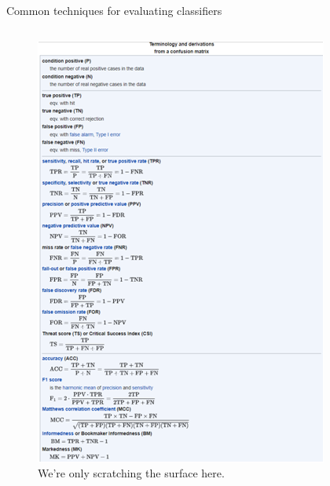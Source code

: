 \documentclass[aspectratio=169]{../latex_main/tntbeamer}  %
\begin{document}
\begin{frame}{Common techniques for evaluating classifiers}
\begin{columns}
	        
	        \begin{column}{.5\textwidth}
	                \begin{figure}
	                    \centering
	                    \includegraphics[scale=.55]{Bild31}\\
	                    We’re only scratching the surface here.
	                \end{figure}
	        \end{column}
	        
	    \end{columns}
	\end{frame}
	
	
\end{document}

